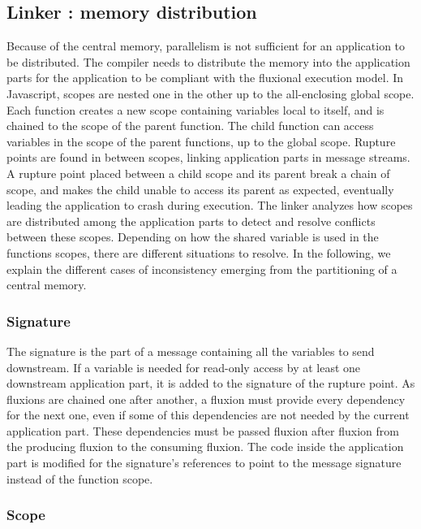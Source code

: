 \subsection{Linker : memory distribution} \label{section:linker}

Because of the central memory, parallelism is not sufficient for an application to be distributed.
The compiler needs to distribute the memory into the application parts for the application to be compliant with the fluxional execution model.
In Javascript, scopes are nested one in the other up to the all-enclosing global scope.
Each function creates a new scope containing variables local to itself, and is chained to the scope of the parent function.
The child function can access variables in the scope of the parent functions, up to the global scope.
Rupture points are found in between scopes, linking application parts in message streams.
A rupture point placed between a child scope and its parent break a chain of scope, and makes the child unable to access its parent as expected, eventually leading the application to crash during execution.
The linker analyzes how scopes are distributed among the application parts to detect and resolve conflicts between these scopes.
Depending on how the shared variable is used in the functions scopes, there are different situations to resolve.
In the following, we explain the different cases of inconsistency emerging from the partitioning of a central memory.

\subsubsection{Signature}

The signature is the part of a message containing all the variables to send downstream.
If a variable is needed for read-only access by at least one downstream application part, it is added to the signature of the rupture point.
As fluxions are chained one after another, a fluxion must provide every dependency for the next one, even if some of this dependencies are not needed by the current application part.
These dependencies must be passed fluxion after fluxion from the producing fluxion to the consuming fluxion.
The code inside the application part is modified for the signature's references to point to the message signature instead of the function scope.

\subsubsection{Scope}


